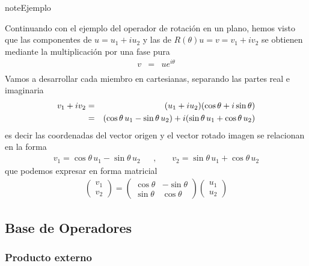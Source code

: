 \documentclass[letterpaper,10pt,english]{jupyterBook}
\begin{document}
\begin{sphinxadmonition}{note}{Ejemplo}

\sphinxAtStartPar
Continuando con el ejemplo del operador de rotación en un plano, hemos visto que las componentes de \(u = u_1 + i u_2\) y las de \(R(\theta)u = v = v_1 + i v_2\) se obtienen mediante la multiplicación por una fase pura
\begin{eqnarray*}
v&=& u e^{i\theta} \\
\end{eqnarray*}
\sphinxAtStartPar
Vamos a desarrollar cada miembro en cartesianas, separando las partes real e imaginaria
\begin{eqnarray*}
v_1 + i v_2 &=& (u_1 + iu_2) (\cos \theta + i \sin \theta)  \\
    \rule{0mm}{6mm}
    &=& (\cos\theta \, u_1 - \sin \theta\,  u_2) + i(\sin\theta\,  u_1 + \cos \theta\,  u_2)
\end{eqnarray*}
\sphinxAtStartPar
es decir las coordenadas del vector origen y el vector rotado imagen se relacionan en la  forma
\begin{eqnarray*}
v_1 = \cos\theta \, u_1 - \sin \theta\,  u_2 ~~~~~~~,~~~~~~~~
v_2 = \sin\theta \, u_1 + \cos \theta\,  u_2     
\end{eqnarray*}
\sphinxAtStartPar
que podemos expresar en forma matricial
\begin{equation*}
\begin{split}
\begin{pmatrix} v_1 \\ v_2 \end{pmatrix} = \begin{pmatrix} \cos\theta & -\sin\theta \\ \sin\theta &\cos\theta\end{pmatrix} \begin{pmatrix} u_1 \\ u_2 \end{pmatrix}
\end{split}
\end{equation*}\end{sphinxadmonition}


\subsection{Base de Operadores}
\label{\detokenize{docs/Part_01_Formalismo/Chapter_01_02_Formalismo_matem_xe1tico/01_03_Operadores_myst:base-de-operadores}}

\subsubsection{Producto externo}
\label{\detokenize{docs/Part_01_Formalismo/Chapter_01_02_Formalismo_matem_xe1tico/01_03_Operadores_myst:producto-externo}}
\sphinxAtStartPar
\end{document}
